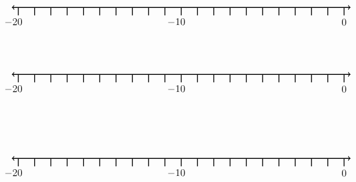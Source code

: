 \documentclass[leqno, 12pt]{article}
\begin{document}
\vspace{10pt}\begin{equation}
    \begin{tikzpicture}[scale=0.67, baseline={([yshift=-1pt]current bounding box.north)}]
        \draw[{To[scale=1.3]}-{To[scale=1.3]}, line width=1pt] (-20.4, 0) -- (0.4, 0);
        \foreach \x in {-20,-19,...,0}
            \draw[shift={(\x,0)},color=black, line width=1pt] (0pt,-14pt) -- (0pt,0pt);
        \foreach \x in {-20,-10}
            \draw[shift={(\x -0.3,-0.8)},color=black] node[font=\large,text height=12pt] {$\x$};
        \foreach \x in {0}
            \draw[shift={(\x,-0.8)},color=black] node[font=\large,text height=12pt] {$\x$};
        \node [font=\large, anchor=east] at (5,1.65) {$  $};
    \end{tikzpicture}
\end{equation}

\vspace{10pt}\begin{equation}
    \begin{tikzpicture}[scale=0.67, baseline={([yshift=-1pt]current bounding box.north)}]
        \draw[{To[scale=1.3]}-{To[scale=1.3]}, line width=1pt] (-20.4, 0) -- (0.4, 0);
        \foreach \x in {-20,-19,...,0}
            \draw[shift={(\x,0)},color=black, line width=1pt] (0pt,-14pt) -- (0pt,0pt);
        \foreach \x in {-20,-10}
            \draw[shift={(\x -0.3,-0.8)},color=black] node[font=\large,text height=12pt] {$\x$};
        \foreach \x in {0}
            \draw[shift={(\x,-0.8)},color=black] node[font=\large,text height=12pt] {$\x$};
        \node [font=\large, anchor=east] at (5,1.65) {$  $};
    \end{tikzpicture}
\end{equation}

\vspace{10pt}\pagebreak ~ \newline ~ \newline\begin{equation}
    \begin{tikzpicture}[scale=0.67, baseline={([yshift=-1pt]current bounding box.north)}]
        \draw[{To[scale=1.3]}-{To[scale=1.3]}, line width=1pt] (-20.4, 0) -- (0.4, 0);
        \foreach \x in {-20,-19,...,0}
            \draw[shift={(\x,0)},color=black, line width=1pt] (0pt,-14pt) -- (0pt,0pt);
        \foreach \x in {-20,-10}
            \draw[shift={(\x -0.3,-0.8)},color=black] node[font=\large,text height=12pt] {$\x$};
        \foreach \x in {0}
            \draw[shift={(\x,-0.8)},color=black] node[font=\large,text height=12pt] {$\x$};
        \node [font=\large, anchor=east] at (5,1.65) {$  $};
    \end{tikzpicture}
\end{equation}
\end{document}
